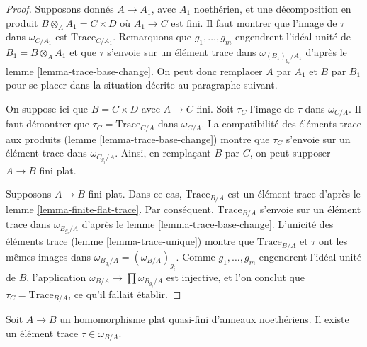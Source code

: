 \begin{proof}
Supposons donnés $A \to A_1$, avec $A_1$ noethérien, et une décomposition
en produit $B \otimes_A A_1 = C \times D$ où $A_1 \to C$ est fini.
Il faut montrer que l'image de $\tau$ dans $\omega_{C/A_1}$ est
$\text{Trace}_{C/A_1}$. Remarquons que $g_1, \ldots, g_m$
engendrent l'idéal unité de $B_1 = B \otimes_A A_1$ et que
$\tau$ s'envoie sur un élément trace dans $\omega_{(B_1)_{g_i}/A_1}$
d'après le lemme \ref{lemma-trace-base-change}. On peut donc remplacer
$A$ par $A_1$ et $B$ par $B_1$ pour se placer dans la situation décrite
au paragraphe suivant.

\medskip\noindent
On suppose ici que $B = C \times D$ avec $A \to C$ fini.
Soit $\tau_C$ l'image de $\tau$ dans $\omega_{C/A}$.
Il faut démontrer que $\tau_C = \text{Trace}_{C/A}$ dans $\omega_{C/A}$.
La compatibilité des éléments trace aux produits
(lemme \ref{lemma-trace-base-change})
montre que $\tau_C$ s'envoie sur un élément trace dans $\omega_{C_{g_i}/A}$.
Ainsi, en remplaçant $B$ par $C$, on peut supposer $A \to B$
fini plat.

\medskip\noindent
Supposons $A \to B$ fini plat. Dans ce cas, $\text{Trace}_{B/A}$
est un élément trace d'après le lemme \ref{lemma-finite-flat-trace}.
Par conséquent, $\text{Trace}_{B/A}$ s'envoie sur un élément trace dans
$\omega_{B_{g_i}/A}$ d'après le lemme \ref{lemma-trace-base-change}.
L'unicité des éléments trace (lemme \ref{lemma-trace-unique})
montre que $\text{Trace}_{B/A}$ et $\tau$ ont
les mêmes images dans $\omega_{B_{g_i}/A} = (\omega_{B/A})_{g_i}$.
Comme $g_1, \ldots, g_m$ engendrent l'idéal unité de $B$, l'application
$\omega_{B/A} \to \prod \omega_{B_{g_i}/A}$ est injective,
et l'on conclut que $\tau_C = \text{Trace}_{B/A}$, ce qu'il fallait établir.
\end{proof}

\begin{lemma}
\label{lemma-dualizing-tau}
Soit $A \to B$ un homomorphisme plat quasi-fini d'anneaux noethériens.
Il existe un élément trace $\tau \in \omega_{B/A}$.
\end{lemma}

